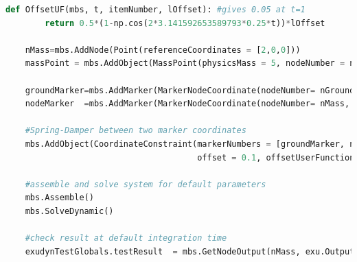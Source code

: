 \label{miniExample_ObjectConnectorCoordinate}
\pythonstyle
\begin{lstlisting}[language=Python, firstnumber=1]
    def OffsetUF(mbs, t, itemNumber, lOffset): #gives 0.05 at t=1
        return 0.5*(1-np.cos(2*3.141592653589793*0.25*t))*lOffset

    nMass=mbs.AddNode(Point(referenceCoordinates = [2,0,0]))
    massPoint = mbs.AddObject(MassPoint(physicsMass = 5, nodeNumber = nMass))
    
    groundMarker=mbs.AddMarker(MarkerNodeCoordinate(nodeNumber= nGround, coordinate = 0))
    nodeMarker  =mbs.AddMarker(MarkerNodeCoordinate(nodeNumber= nMass, coordinate = 0))
    
    #Spring-Damper between two marker coordinates
    mbs.AddObject(CoordinateConstraint(markerNumbers = [groundMarker, nodeMarker], 
                                       offset = 0.1, offsetUserFunction = OffsetUF)) 

    #assemble and solve system for default parameters
    mbs.Assemble()
    mbs.SolveDynamic()

    #check result at default integration time
    exudynTestGlobals.testResult  = mbs.GetNodeOutput(nMass, exu.OutputVariableType.Displacement)[0]
\end{lstlisting}

